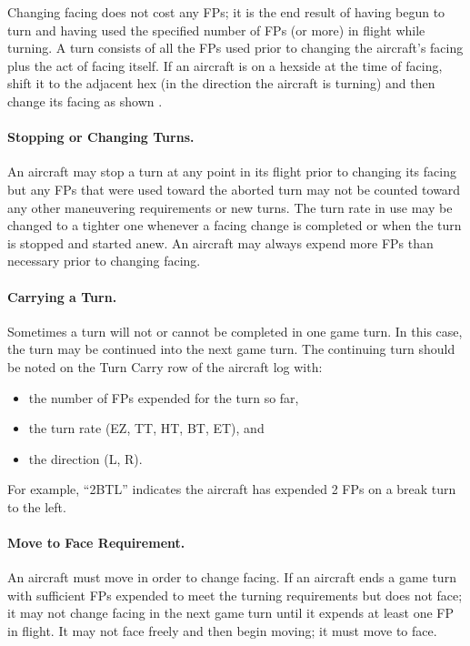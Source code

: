 Changing facing does not cost any FPs; it is the end result of having begun to turn and having used the specified number of FPs (or more) in flight while turning. A turn consists of all the FPs used prior to changing the aircraft's facing plus the act of facing itself. If an aircraft is on a hexside at the time of facing, shift it to the adjacent hex (in the direction the aircraft is turning) and then change its facing as shown . 



\paragraph{Stopping or Changing Turns.} 
An aircraft may stop a turn at any point in its flight prior to changing its facing but any FPs that were used toward the aborted turn may not be counted toward any other maneuvering requirements or new turns. The turn rate in use may be changed to a tighter one whenever a facing change is completed or when the turn is stopped and started anew. An aircraft may always expend more FPs than necessary prior to changing facing.


\paragraph{Carrying a Turn.} 
Sometimes a turn will not or cannot be completed in one game turn. In this case, the turn may be continued into the next game turn. The continuing turn should be noted on the Turn Carry row of the aircraft log with:
\begin{itemize}

    \item the number of FPs expended for the turn so far,

    \item the turn rate (EZ, TT, HT, BT, ET), and

    \item the direction (L, R).

\end{itemize}

For example, “2BTL” indicates the aircraft has expended 2 FPs on a break turn to the left.

\paragraph{Move to Face Requirement.} 
An aircraft must move in order to change facing. If an aircraft ends a game turn with sufficient FPs expended to meet the turning requirements but does not face; it may not change facing in the next game turn until it expends at least one FP in flight.  It may not face freely and then begin moving; it must move to face.

